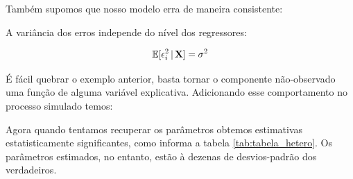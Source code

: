 Também supomos que nosso modelo erra de maneira consistente:

\begin{hipotese}[Homocedasticidade]
A variância dos erros independe do nível dos regressores:

\begin{align}
    \mathbb{E}[\epsilon_i^2\, |\, \mathbf{X} ] = \sigma^2
\end{align}


\end{hipotese}

\begin{exemplo}[Heterocedasticidade]
É fácil quebrar o exemplo anterior, basta tornar o componente não-observado uma função de alguma variável explicativa. Adicionando esse comportamento no processo simulado temos:

\begin{figure}[H]
    \centering
    
\end{figure}



Agora quando tentamos recuperar os parâmetros obtemos estimativas estatisticamente significantes, como informa a tabela \ref{tab:tabela_hetero}. Os parâmetros estimados, no entanto, estão à dezenas de desvios-padrão dos verdadeiros.


\end{exemplo}





